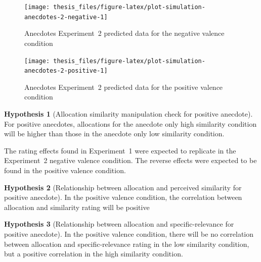 \documentclass[a4paper, nobind, dvipsnames]{templates/ociamthesis}
\theoremstyle{definition}
\theoremstyle{definition}
\theoremstyle{definition}
\theoremstyle{definition}
\newtheorem{hypothesis}{Hypothesis}[chapter]
\theoremstyle{remark}
\begin{document}
\begin{figure}
\texttt{[image: thesis\_files/figure-latex/plot-simulation-anecdotes-2-negative-1]} \caption{Anecdotes Experiment~2 predicted data for the negative valence condition}\label{fig:plot-simulation-anecdotes-2-negative}
\end{figure}



\begin{figure}
\texttt{[image: thesis\_files/figure-latex/plot-simulation-anecdotes-2-positive-1]} \caption{Anecdotes Experiment~2 predicted data for the positive valence condition}\label{fig:plot-simulation-anecdotes-2-positive}
\end{figure}

\begin{hypothesis}[Allocation similarity manipulation check for positive anecdote]
\protect\hypertarget{hyp:similarity-check-anecdotes-2}{}{\label{hyp:similarity-check-anecdotes-2} {} }For positive anecdotes, allocations for the anecdote only high similarity
condition will be higher than those in the anecdote only low similarity
condition.
\end{hypothesis}

The rating effects found in Experiment~1 were expected to replicate in the
Experiment~2 negative valence condition. The reverse effects were expected to be
found in the positive valence condition.

\begin{hypothesis}[Relationship between allocation and perceived similarity for positive anecdote]
\protect\hypertarget{hyp:allocation-similarity-anecdotes-2}{}{\label{hyp:allocation-similarity-anecdotes-2} {} }In the positive valence condition, the correlation between allocation and
similarity rating will be positive
\end{hypothesis}

\begin{hypothesis}[Relationship between allocation and specific-relevance for positive anecdote]
\protect\hypertarget{hyp:allocation-specific-relevance-anecdotes-2}{}{\label{hyp:allocation-specific-relevance-anecdotes-2} {} }In the positive valence condition, there will be no correlation between
allocation and specific-relevance rating in the low similarity condition, but a
positive correlation in the high similarity condition.
\end{hypothesis}
\end{document}
